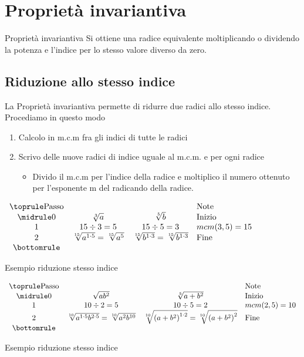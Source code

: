 \section{Proprietà invariantiva}
\label{Sec:Propinvariantivaradicali}
\begin{definizionet}{Proprietà invariantiva}{}
Si ottiene una radice equivalente moltiplicando o dividendo la potenza e l'indice per lo stesso valore diverso da zero.
\end{definizionet}
\subsection{Riduzione allo stesso indice}
\label{sec:RiduzioneAlloStessoIndice}

La Proprietà invariantiva permette di ridurre due radici allo stesso indice. Procediamo in questo modo
\begin{enumerate}
	\item Calcolo in m.c.m fra gli indici di tutte le radici
	\item Scrivo delle nuove radici di indice uguale al m.c.m. e per ogni radice
	\begin{itemize}
	\item Divido il m.c.m per l'indice  della radice e moltiplico il numero ottenuto per l'esponente m del radicando della  radice.
	\end{itemize}
\end{enumerate}

\begin{table}[H]
\centering
$
\begin{array}{cccl}
\toprule
\text{Passo} &  &  & \text{Note} \\  
\midrule
0 & \sqrt[3]{a} &\sqrt[5]{b}  &\text{Inizio} \\ 
1 & 15\div 3=5 &15\div 5=3  & mcm(3,5)=15 \\  
2 &\sqrt[15]{a^{1\cdot5}}=\sqrt[15]{a^{5}}  &\sqrt[15]{b^{1\cdot3}}=\sqrt[15]{b^{1\cdot3}}  &\text{Fine} \\
\bottomrule	
\end{array} 
$
\label{tab:Es1Ridstessoindice}
\caption{Esempio riduzione stesso indice}
\end{table}
\begin{table}[H]
\centering
$
\begin{array}{cccl}
\toprule
\text{Passo} &  &  &\text{Note} \\  
\midrule
0 & \sqrt{ab^2} &\sqrt[5]{a+b^2}  &\text{Inizio} \\ 
1 & 10\div 2=5 &10\div 5=2  & mcm(2,5)=10 \\  
2 &\sqrt[10]{a^{1\cdot 5}b^{2\cdot 5}}=\sqrt[10]{a^{2}b^{10}}& \sqrt[10]{\left( a+b^2\right)^{1\cdot 2} }=\sqrt[10]{\left( a+b^2\right)^{2} }   &\text{Fine} \\
\bottomrule	
\end{array} 
$
\label{tab:Es1Ridstessoindice2}
\caption{Esempio riduzione stesso indice}
\end{table}
